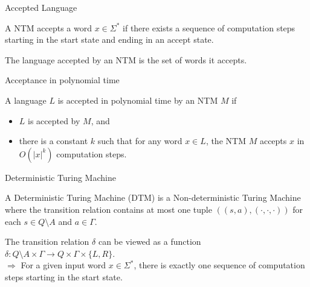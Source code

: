 \begin{frame}{Accepted Language}
	\begin{definition}
		A NTM \alert{accepts} a word $x\in \Sigma^*$ if there exists a sequence of computation steps starting in the start state and ending in an accept state.
	\end{definition}
	\begin{definition}
		The language \alert{accepted} by an NTM is the set of words it accepts.
	\end{definition}
\end{frame}


\begin{frame}{Acceptance in polynomial time}
	\begin{definition}
		A language $L$ is \alert{accepted in polynomial time} by an NTM $M$ if
		\begin{itemize}
			\item $L$ is accepted by $M$, and
			\item there is a constant $k$ such that for any word $x\in L$, the NTM $M$ accepts $x$ in $O(|x|^k)$ computation steps.
		\end{itemize}
	\end{definition}
\end{frame}


\begin{frame}{Deterministic Turing Machine}

	\begin{definition}
		A \alert{Deterministic Turing Machine (DTM)} is a Non-deterministic Turing Machine where the transition relation contains at most one tuple $((s,a),(\cdot,\cdot,\cdot))$ for each $s\in Q\setminus A$ and $a\in \Gamma$.
	\end{definition}
	The transition relation $\delta$ can be viewed as a function $\delta: Q \setminus A \times \Gamma \rightarrow Q \times \Gamma \times \{L,R\}$.\\
	$\Rightarrow$ For a given input word $x \in \Sigma^*$, there is exactly one sequence of computation steps starting in the start state.

\end{frame}

